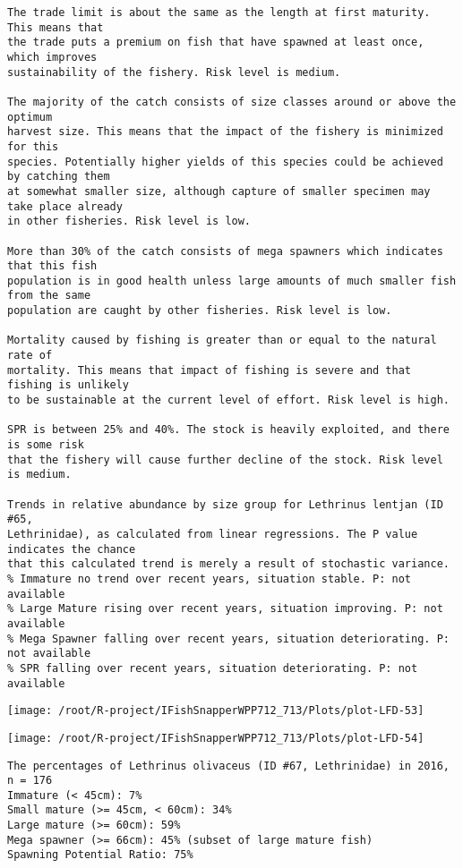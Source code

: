 \documentclass{report}\usepackage[]{graphicx}\usepackage[]{color}
\makeatletter
\def\maxwidth{ %
  \ifdim\Gin@nat@width>\linewidth
    \linewidth
  \else
    \Gin@nat@width
  \fi
}
\newenvironment{kframe}{%
 \def\at@end@of@kframe{}%
 \ifinner\ifhmode%
  \def\at@end@of@kframe{\end{minipage}}%
  \begin{minipage}{\columnwidth}%
 \fi\fi%
 \def\FrameCommand##1{\hskip\@totalleftmargin \hskip-\fboxsep
 \colorbox{shadecolor}{##1}\hskip-\fboxsep
     \hskip-\linewidth \hskip-\@totalleftmargin \hskip\columnwidth}%
 \MakeFramed {\advance\hsize-\width
   \@totalleftmargin\z@ \linewidth\hsize
   \@setminipage}}%
 {\par\unskip\endMakeFramed%
 \at@end@of@kframe}
\newenvironment{knitrout}{}{} %
\makeatother
\begin{document}
\begin{knitrout}
\begin{kframe}
\begin{verbatim}
The trade limit is about the same as the length at first maturity.  This means that
the trade puts a premium on fish that have spawned at least once, which improves
sustainability of the fishery. Risk level is medium.

The majority of the catch consists of size classes around or above the optimum
harvest size. This means that the impact of the fishery is minimized for this
species. Potentially higher yields of this species could be achieved by catching them
at somewhat smaller size, although capture of smaller specimen may take place already
in other fisheries. Risk level is low.

More than 30% of the catch consists of mega spawners which indicates that this fish
population is in good health unless large amounts of much smaller fish from the same
population are caught by other fisheries. Risk level is low.
 
Mortality caused by fishing is greater than or equal to the natural rate of
mortality. This means that impact of fishing is severe and that fishing is unlikely
to be sustainable at the current level of effort. Risk level is high.
 
SPR is between 25% and 40%. The stock is heavily exploited, and there is some risk
that the fishery will cause further decline of the stock. Risk level is medium.
 
Trends in relative abundance by size group for Lethrinus lentjan (ID #65,
Lethrinidae), as calculated from linear regressions. The P value indicates the chance
that this calculated trend is merely a result of stochastic variance.
% Immature no trend over recent years, situation stable. P: not available
% Large Mature rising over recent years, situation improving. P: not available
% Mega Spawner falling over recent years, situation deteriorating. P: not available
% SPR falling over recent years, situation deteriorating. P: not available
\end{verbatim}
\end{kframe}
\texttt{[image: /root/R-project/IFishSnapperWPP712\_713/Plots/plot-LFD-53]} 

\texttt{[image: /root/R-project/IFishSnapperWPP712\_713/Plots/plot-LFD-54]} 
\begin{kframe}\begin{verbatim}
The percentages of Lethrinus olivaceus (ID #67, Lethrinidae) in 2016, n = 176
Immature (< 45cm): 7%
Small mature (>= 45cm, < 60cm): 34%
Large mature (>= 60cm): 59%
Mega spawner (>= 66cm): 45% (subset of large mature fish)
Spawning Potential Ratio: 75%
 

\end{verbatim}
\end{kframe}
\end{knitrout}
\end{document}
